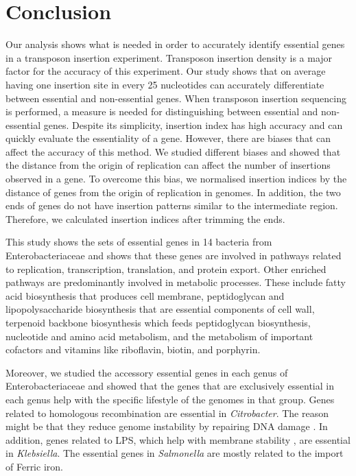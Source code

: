 \documentclass[12pt,letterpaper]{article}
\begin{document}
\section{Conclusion}
Our analysis shows what is needed in order to accurately identify essential genes in a transposon insertion experiment. Transposon insertion density is a major factor for the accuracy of this experiment. Our study shows that on average having one insertion site in every 25 nucleotides can accurately differentiate between essential and non-essential genes. When transposon insertion sequencing is performed, a measure is needed for distinguishing between essential and non-essential genes. Despite its simplicity, insertion index has high accuracy and can quickly evaluate the essentiality of a gene. However, there are biases that can affect the accuracy of this method. We studied different biases and showed that the distance from the origin of replication can affect the number of insertions observed in a gene. To overcome this bias, we normalised insertion indices by the distance of genes from the origin of replication in genomes. In addition, the two ends of genes do not have insertion patterns similar to the intermediate region. Therefore, we calculated insertion indices after trimming the ends.

This study shows the sets of essential genes in 14 bacteria from Enterobacteriaceae and shows that these genes are involved in pathways related to replication, transcription, translation, and protein export. Other enriched pathways are predominantly involved in metabolic processes. These include fatty acid biosynthesis that produces cell membrane, peptidoglycan and lipopolysaccharide biosynthesis that are essential components of cell wall, terpenoid backbone biosynthesis which feeds peptidoglycan biosynthesis, nucleotide and amino acid metabolism, and the metabolism of important cofactors and vitamins like riboflavin, biotin, and porphyrin.

Moreover, we studied the accessory essential genes in each genus of Enterobacteriaceae and showed that the genes that are exclusively essential in each genus help with the specific lifestyle of the genomes in that group. Genes related to homologous recombination are essential in \textit{Citrobacter}. The reason might be that they reduce genome instability by repairing DNA damage \cite{darmon_bacterial_2014}. In addition, genes related to LPS, which help with membrane stability \cite{salton_structure_1996}, are essential in \textit{Klebsiella}. The essential genes in \textit{Salmonella} are mostly related to the import of Ferric iron.
\end{document}
